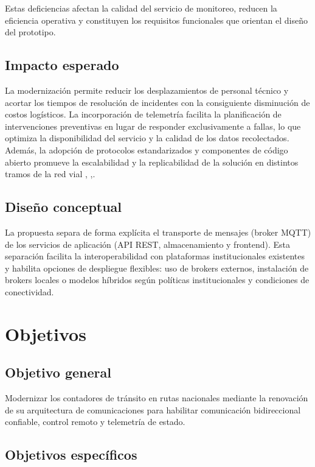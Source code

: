 Estas deficiencias afectan la calidad del servicio de monitoreo, reducen la eficiencia operativa y constituyen los requisitos funcionales que orientan el diseño del prototipo.




\subsection{Impacto esperado}
La modernización permite reducir los desplazamientos de personal técnico y acortar los tiempos de resolución de incidentes con la consiguiente disminución de costos logísticos. La incorporación de telemetría facilita la planificación de intervenciones preventivas en lugar de responder exclusivamente a fallas, lo que optimiza la disponibilidad del servicio y la calidad de los datos recolectados. Además, la adopción de protocolos estandarizados y componentes de código abierto promueve la escalabilidad y la replicabilidad de la solución en distintos tramos de la red vial \cite{miovision} ,\cite{sensys} ,\cite{metrocount}.
\subsection{Diseño conceptual} 
La propuesta separa de forma explícita el transporte de mensajes (broker MQTT) de los servicios de aplicación (API REST, almacenamiento y frontend). Esta separación facilita la interoperabilidad con plataformas institucionales existentes y habilita opciones de despliegue flexibles: uso de brokers externos, instalación de brokers locales o modelos híbridos según políticas institucionales y condiciones de conectividad.

\section{Objetivos}

\subsection{Objetivo general}

Modernizar los contadores de tránsito en rutas nacionales mediante la renovación de su arquitectura de comunicaciones para habilitar comunicación bidireccional confiable, control remoto y telemetría de estado.

\subsection{Objetivos específicos}


